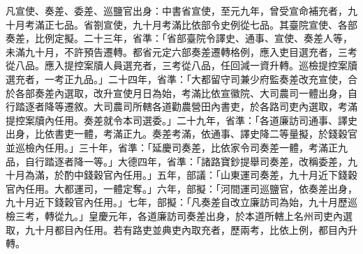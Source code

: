 \begin{pinyinscope}
 凡宣使、奏差、委差、巡鹽官出身：中書省宣使，至元九年，曾受宣命補充者，九十月考滿正七品。省劄宣使，九十月考滿比依部令史例從七品。其臺院宣使、各部奏差，比例定擬。二十三年，省準：「省部臺院令譯史、通事、宣使、奏差人等，未滿九十月，不許預告遷轉。都省元定六部奏差遷轉格例，應入吏目選充者，三考從八品。應入提控案牘人員選充者，三考從八品，任回減一資升轉。巡檢提控案牘選充者，一考正九品。」二十四年，省準：「大都留守司兼少府監奏差改充宣使，合於各部奏差內選取，改升宣使月日為始，考滿比依宣徽院、大司農司一體出身，自行踏逐者降等遷敘。大司農司所轄各道勸農營田內書吏，於各路司吏內選取，考滿提控案牘內任用。奏差就令本司選委。」二十九年，省準：「各道廉訪司通事、譯史出身，比依書吏一體，考滿正九。奏差考滿，依通事、譯史降二等量擬，於錢穀官並巡檢內任用。」三十年，省準：「延慶司奏差，比依家令司奏差一體，考滿正九品，自行踏逐者降一等。」大德四年，省準：「諸路寶鈔提舉司奏差，改稱委差，九十月為滿，於酌中錢穀官內任用。」五年，部議：「山東運司奏差，九十月近下錢穀官內任用。大都運司，一體定奪。」六年，部擬：「河間運司巡鹽官，依奏差出身，九十月近下錢穀官內任用。」七年，部擬：「凡奏差自改立廉訪司為始，九十月歷巡檢三考，轉從九。」皇慶元年，各道廉訪司奏差出身，於本道所轄上名州司吏內選取，九十月都目內任用。若有路吏並典吏內取充者，歷兩考，比依上例，都目內升轉。




\end{pinyinscope}
